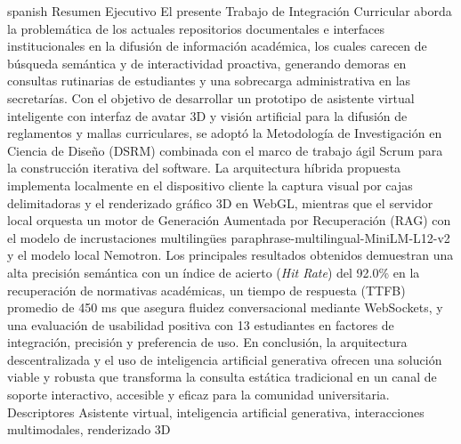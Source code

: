 \UTIResumenPagina
  {spanish}
  {Resumen Ejecutivo}
  {El presente Trabajo de Integración Curricular aborda la problemática de los actuales repositorios documentales e interfaces institucionales en la difusión de información académica, los cuales carecen de búsqueda semántica y de interactividad proactiva, generando demoras en consultas rutinarias de estudiantes y una sobrecarga administrativa en las secretarías. Con el objetivo de desarrollar un prototipo de asistente virtual inteligente con interfaz de avatar 3D y visión artificial para la difusión de reglamentos y mallas curriculares, se adoptó la Metodología de Investigación en Ciencia de Diseño (DSRM) combinada con el marco de trabajo ágil Scrum para la construcción iterativa del software. La arquitectura híbrida propuesta implementa localmente en el dispositivo cliente la captura visual por cajas delimitadoras y el renderizado gráfico 3D en WebGL, mientras que el servidor local orquesta un motor de Generación Aumentada por Recuperación (RAG) con el modelo de incrustaciones multilingües paraphrase-multilingual-MiniLM-L12-v2 y el modelo local Nemotron. Los principales resultados obtenidos demuestran una alta precisión semántica con un índice de acierto (\textit{Hit Rate}) del 92.0\% en la recuperación de normativas académicas, un tiempo de respuesta (TTFB) promedio de 450 ms que asegura fluidez conversacional mediante WebSockets, y una evaluación de usabilidad positiva con 13 estudiantes en factores de integración, precisión y preferencia de uso. En conclusión, la arquitectura descentralizada y el uso de inteligencia artificial generativa ofrecen una solución viable y robusta que transforma la consulta estática tradicional en un canal de soporte interactivo, accesible y eficaz para la comunidad universitaria.}
  {Descriptores}
  {Asistente virtual, inteligencia artificial generativa, interacciones multimodales, renderizado 3D}